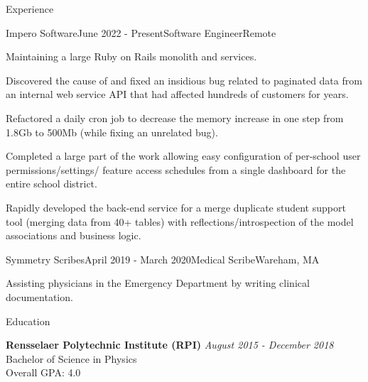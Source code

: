 \documentclass{resume}
\begin{document}
  \begin{rSection}{Experience}

  \begin{rSubsection}{Impero Software}{June 2022 - Present}{Software Engineer}{Remote}
      \item Maintaining a large Ruby on Rails monolith and services. \item Discovered the cause of and fixed an insidious bug related to paginated data from an internal web service API that had affected hundreds of customers for years.
      \item Refactored a daily cron job to decrease the memory increase in one step from 1.8Gb to 500Mb (while fixing an unrelated bug). 
      \item Completed a large part of the work allowing easy configuration of per-school user permissions/settings/ feature access schedules from a single dashboard for the entire school district.
      \item Rapidly developed the back-end service for a merge duplicate student support tool (merging data from 40+ tables) with reflections/introspection of the model associations and business logic.
  \end{rSubsection}

    \begin{rSubsection}{Symmetry Scribes}{April 2019 - March 2020}{Medical Scribe}{Wareham, MA}
    \item Assisting physicians in the Emergency Department by writing clinical documentation.
    \end{rSubsection}

  
  \end{rSection}

  \begin{rSection}{Education}



    {\bf Rensselaer Polytechnic Institute (RPI)} \hfill {\em August 2015 - December 2018} \\ 
    Bachelor of Science in Physics  \\
    Overall GPA: 4.0
  \end{rSection}
\end{document}
